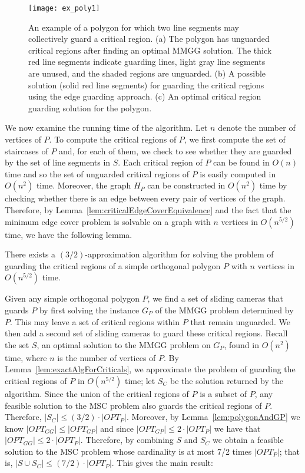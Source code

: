 \documentclass{llncs}
\begin{document}
\begin{figure}[t!]
\centering \texttt{[image: ex\_poly1]}
\caption{An example of a polygon for which two line segments may collectively guard a critical region.  (a) The polygon has unguarded critical regions after finding an optimal MMGG solution. The thick red line segments indicate guarding lines, light gray line segments are unused, and the shaded regions are unguarded.
(b) A possible solution (solid red line segments) for guarding the critical regions using the edge guarding approach. (c) An optimal critical region guarding solution for the polygon.}
\label{fig:ex_poly}\end{figure}

We now examine the running time of the algorithm. Let $n$ denote the number of vertices of $P$.
To compute the critical regions of $P$, we first compute the set of staircases of $P$ and, for each of them, we check to see whether
they are guarded by the set of line segments in $S$. Each critical region of $P$ can be found
in $O(n)$ time and so the set of unguarded critical regions of $P$ is easily computed in $O(n^2)$ time.
Moreover, the graph $H_P$ can be constructed
in $O(n^2)$ time by checking whether there is an edge between every pair of vertices of the graph. Therefore,
by Lemma~\ref{lem:criticalEdgeCoverEquivalence} and the fact that the minimum edge cover
problem is solvable on a graph with $n$ vertices in $O(n^{5/2})$ time, we have the following
lemma.
\begin{lemma}
\label{lem:exactAlgForCriticals}
There exists a $(3/2)$-approximation algorithm for solving the problem of guarding the critical regions of
a simple orthogonal polygon $P$ with $n$ vertices in $O(n^{5/2})$ time.
\end{lemma}

Given any simple orthogonal polygon $P$, we find a set of sliding cameras that guards $P$ 
by first solving the instance $G_P$ of the MMGG problem determined by $P$. This may leave a set of critical regions within $P$
that remain unguarded. We then add a second set of sliding cameras to guard these critical regions.
Recall the set $S$, an optimal solution to the MMGG problem on $G_P$, found in $O(n^2)$ time,
where $n$ is the number of vertices of $P$.
By Lemma~\ref{lem:exactAlgForCriticals}, we approximate the problem of guarding the critical
regions of $P$ in $O(n^{5/2})$ time;
let $S_C$ be the solution returned by the algorithm. 
Since the union of the critical regions of $P$ is
a subset of $P$, any feasible solution to the MSC problem also guards the critical regions of $P$. 
Therefore, $\lvert S_C\rvert\leq (3/2) \cdot \lvert OPT_P\rvert$.
Moreover, by Lemma~\ref{lem:polygonAndGP} we know $\lvert OPT_{GG}\rvert\leq \lvert OPT_{GP}\rvert$ and since
$\lvert OPT_{GP}\rvert\leq 2\cdot\lvert OPT_{P} \rvert$ we have that $\lvert OPT_{GG}\rvert\leq 2\cdot\lvert OPT_P\rvert$.
Therefore, by combining $S$ and $S_C$ we obtain a feasible solution
to the MSC problem whose cardinality is at most 7/2 times $\lvert OPT_P\rvert$; that is,
$\lvert S\cup S_C\rvert\leq (7/2) \cdot\lvert OPT_P\rvert$. This gives the main result:
\end{document}
